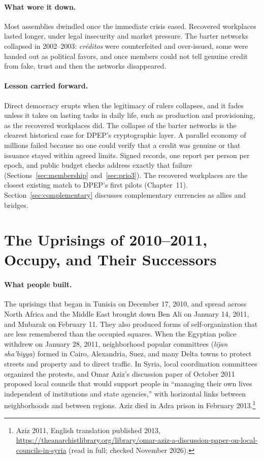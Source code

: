\documentclass[10pt,twoside,openany]{book}
\theoremstyle{dpepstyle}
\begin{document}
\paragraph{What wore it down.} Most assemblies dwindled once the immediate crisis eased. Recovered workplaces lasted longer, under legal insecurity and market pressure. The barter networks collapsed in 2002--2003: \emph{cr\'editos} were counterfeited and over-issued, some were handed out as political favors, and once members could not tell genuine credit from fake, trust and then the networks disappeared.

\paragraph{Lesson carried forward.} Direct democracy erupts when the legitimacy of rulers collapses, and it fades unless it takes on lasting tasks in daily life, such as production and provisioning, as the recovered workplaces did. The collapse of the barter networks is the clearest historical case for DPEP's cryptographic layer. A parallel economy of millions failed because no one could verify that a credit was genuine or that issuance stayed within agreed limits. Signed records, one report per person per epoch, and public budget checks address exactly that failure (Sections~\ref{sec:membership} and~\ref{sec:prio3}). The recovered workplaces are the closest existing match to DPEP's first pilots (Chapter~11). Section~\ref{sec:complementary} discusses complementary currencies as allies and bridges.

\section{The Uprisings of 2010--2011, Occupy, and Their Successors}
\label{sec:hist-uprisings}

\paragraph{What people built.} The uprisings that began in Tunisia on December 17, 2010, and spread across North Africa and the Middle East brought down Ben Ali on January 14, 2011, and Mubarak on February 11. They also produced forms of self-organization that are less remembered than the occupied squares. When the Egyptian police withdrew on January 28, 2011, neighborhood popular committees (\emph{lijan sha'biyya}) formed in Cairo, Alexandria, Suez, and many Delta towns to protect streets and property and to direct traffic. In Syria, local coordination committees organized the protests, and Omar Aziz's discussion paper of October 2011 proposed local councils that would support people in ``managing their own lives independent of institutions and state agencies,'' with horizontal links between neighborhoods and between regions. Aziz died in Adra prison in February 2013.\footnote{Aziz 2011, English translation published 2013, \url{https://theanarchistlibrary.org/library/omar-aziz-a-discussion-paper-on-local-councils-in-syria} (read in full; checked November 2026).}
\end{document}
